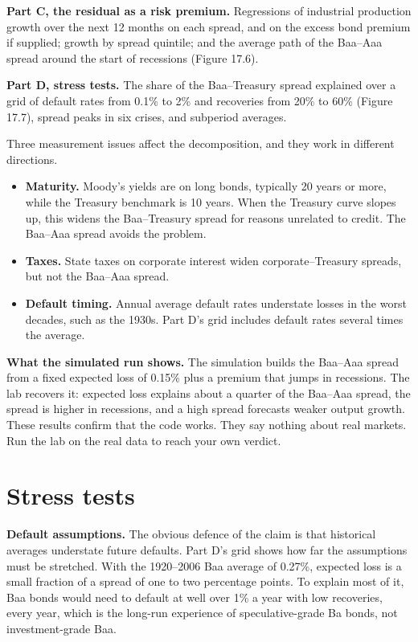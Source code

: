 \textbf{Part C, the residual as a risk premium.} Regressions of industrial production growth over the next 12 months on each spread, and on the excess bond premium if supplied; growth by spread quintile; and the average path of the Baa--Aaa spread around the start of recessions (Figure 17.6).

\textbf{Part D, stress tests.} The share of the Baa--Treasury spread explained over a grid of default rates from 0.1\% to 2\% and recoveries from 20\% to 60\% (Figure 17.7), spread peaks in six crises, and subperiod averages.

Three measurement issues affect the decomposition, and they work in different directions.

\begin{itemize}
  \item \textbf{Maturity.} Moody's yields are on long bonds, typically 20 years or more, while the Treasury benchmark is 10 years. When the Treasury curve slopes up, this widens the Baa--Treasury spread for reasons unrelated to credit. The Baa--Aaa spread avoids the problem.
  \item \textbf{Taxes.} State taxes on corporate interest widen corporate--Treasury spreads, but not the Baa--Aaa spread.
  \item \textbf{Default timing.} Annual average default rates understate losses in the worst decades, such as the 1930s. Part D's grid includes default rates several times the average.
\end{itemize}

\textbf{What the simulated run shows.} The simulation builds the Baa--Aaa spread from a fixed expected loss of 0.15\% plus a premium that jumps in recessions. The lab recovers it: expected loss explains about a quarter of the Baa--Aaa spread, the spread is higher in recessions, and a high spread forecasts weaker output growth. These results confirm that the code works. They say nothing about real markets. Run the lab on the real data to reach your own verdict.

\section{Stress tests}
\label{sec:17-stress}

\textbf{Default assumptions.} The obvious defence of the claim is that historical averages understate future defaults. Part D's grid shows how far the assumptions must be stretched. With the 1920--2006 Baa average of 0.27\%, expected loss is a small fraction of a spread of one to two percentage points. To explain most of it, Baa bonds would need to default at well over 1\% a year with low recoveries, every year, which is the long-run experience of speculative-grade Ba bonds, not investment-grade Baa.

